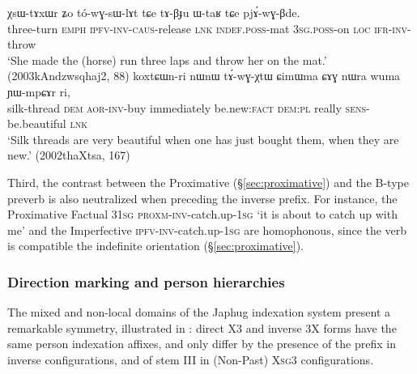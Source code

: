 \begin{exe}
	\ex   \label{ex:to.tA.ambiguity}
	\begin{xlist}
		\ex   \label{ex:towGsWlAt}
		\gll χsɯ-tɤxɯr ʑo tó-wɣ-sɯ-lɤt tɕe tɤ-βɟu ɯ-taʁ tɕe pjɤ́-wɣ-βde. \\
		three-turn \textsc{emph} \textsc{ipfv}-\textsc{inv}-\textsc{caus}-release \textsc{lnk} \textsc{indef}.\textsc{poss}-mat \textsc{3sg}.\textsc{poss}-on \textsc{loc} \textsc{ifr}-\textsc{inv}-throw \\
		\glt `She made the (horse) run three laps and throw her on the mat.' (2003kAndzwsqhaj2, 88)
		\ex   \label{ex:tAwGXtW.CimWma}
		\gll  koxtɕɯn-ri nɯnɯ tɤ́-wɣ-χtɯ ɕimɯma ɕɤɣ nɯra wuma ɲɯ-mpɕɤr ri, \\
		silk-thread \textsc{dem} \textsc{aor}-\textsc{inv}-buy immediately be.new:\textsc{fact} \textsc{dem}:\textsc{pl} really \textsc{sens}-be.beautiful \textsc{lnk} \\
		\glt `Silk threads are very beautiful when one has just bought them, when they are new.' (2002thaXtsa, 167)
	\end{xlist}
\end{exe}

Third, the contrast between the Proximative  (§\ref{sec:proximative}) and the B-type  preverb is also neutralized when preceding the inverse prefix. For instance, the Proximative Factual 3\fl{}\textsc{1sg}  \textsc{proxm}-\textsc{inv}-catch.up-\textsc{1sg} `it is about to catch up with me' and the Imperfective  \textsc{ipfv}-\textsc{inv}-catch.up-\textsc{1sg} are homophonous, since the verb  is compatible the indefinite orientation  (§\ref{sec:proximative}).



\subsubsection{Direction marking and person hierarchies} \label{sec:direct-inverse}
The mixed and non-local domains of the Japhug indexation system present a remarkable symmetry, illustrated in : direct X\fl{}3 and inverse 3\fl{}X forms have the same person indexation affixes, and only differ by the presence of the prefix  in inverse configurations, and of stem III in (Non-Past) X\textsc{sg}\fl{}3 configurations. 


